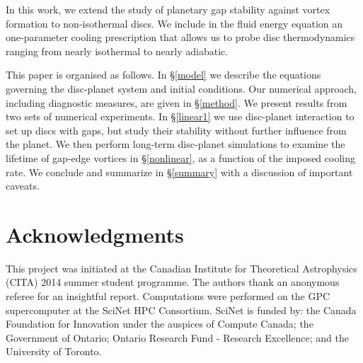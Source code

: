 \documentclass[useAMS,usenatbib]{mn2e}
\begin{document}
In this work, we extend the study of planetary gap stability against
vortex formation to non-isothermal discs. We include in the fluid energy
equation an one-parameter cooling prescription that allows us to probe
disc thermodynamics ranging from nearly isothermal to nearly
adiabatic.      

This paper is organised as follows. In \S\ref{model} we describe the
equations governing the disc-planet system and initial conditions. Our
numerical approach, including diagnostic measures, are given in
\S\ref{method}. We present results from two sets of numerical
experiments. In \S\ref{linear1} we use disc-planet interaction to set
up discs with gaps, but study their stability without further
influence from the planet. 
We then perform long-term disc-planet simulations to examine the
lifetime of gap-edge vortices in \S\ref{nonlinear},  
as a function of the imposed cooling rate. We conclude and summarize
in \S\ref{summary} with a discussion of important caveats. 





%


\section*{Acknowledgments}
This project was initiated at the Canadian Institute for Theoretical
Astrophysics (CITA) 2014 summer student programme. The authors
  thank an anonymous referee for an insightful report. 
Computations were performed on the GPC supercomputer at the
SciNet HPC Consortium. SciNet is funded by: the Canada Foundation for
Innovation under the auspices of Compute Canada; the Government of
Ontario; Ontario Research Fund - Research Excellence; and the
University of Toronto.   




\appendix
%
%
\end{document}
